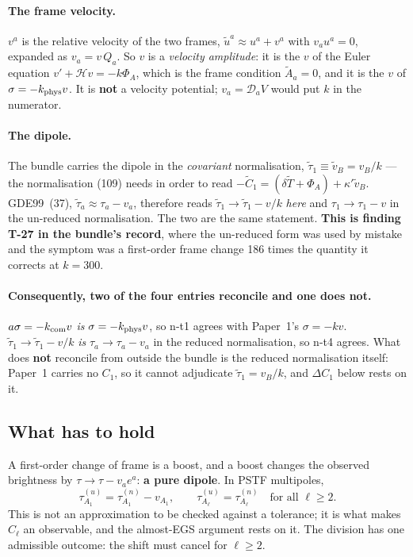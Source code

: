 \paragraph{The frame velocity.} $v^a$ is the relative velocity of the two
frames, $\tilde u^a\approx u^a+v^a$ with $v_au^a=0$, expanded as $v_a=v\,Q_a$.
So $v$ is a \emph{velocity amplitude}: it is the $v$ of the Euler equation
$v'+\mathcal Hv=-k\Phi_A$, which is the frame condition $\tilde A_a=0$, and it
is the $v$ of $\sigma=-k_{\rm phys}v$. It is \textbf{not} a velocity potential;
$v_a=\mathcal D_aV$ would put $k$ in the numerator.

\paragraph{The dipole.} The bundle carries the dipole in the \emph{covariant}
normalisation, $\tilde\tau_1\equiv\tilde v_B=v_B/k$ --- the normalisation (109)
needs in order to read $-\tilde C_1=(\delta\tilde T+\Phi_A)+\kappa'\tilde v_B$.
GDE99~(37), $\tilde\tau_a\approx\tau_a-v_a$, therefore reads
$\tilde\tau_1\to\tilde\tau_1-v/k$ \emph{here} and $\tau_1\to\tau_1-v$ in the
un-reduced normalisation. The two are the same statement. \textbf{This is finding
T-27 in the bundle's record}, where the un-reduced form was used by mistake
and the symptom was a first-order frame change 186 times the quantity it
corrects at $k=300$.

\paragraph{Consequently, two of the four entries reconcile and one does not.}
$a\sigma=-k_{\rm com}v$ \emph{is} $\sigma=-k_{\rm phys}v$, so n-t1 agrees with
Paper~1's $\sigma=-kv$. $\tilde\tau_1\to\tilde\tau_1-v/k$ \emph{is}
$\tau_a\to\tau_a-v_a$ in the reduced normalisation, so n-t4 agrees. What does
\textbf{not} reconcile from outside the bundle is the reduced normalisation
itself: Paper~1 carries no $C_1$, so it cannot adjudicate
$\tilde\tau_1=v_B/k$, and $\Delta C_1$ below rests on it.

\subsection{What has to hold}

A first-order change of frame is a boost, and a boost changes the observed
brightness by $\tau\to\tau-v_ae^a$: \textbf{a pure dipole}. In PSTF multipoles,
\begin{equation}
  \tau^{(u)}_{A_1}=\tau^{(n)}_{A_1}-v_{A_1},
  \qquad
  \tau^{(u)}_{A_\ell}=\tau^{(n)}_{A_\ell}\quad\text{for all }\ell\ge2 .
  \label{eq:boost-is-a-dipole}
\end{equation}
This is not an approximation to be checked against a tolerance; it is what
makes $C_\ell$ an observable, and the almost-EGS argument rests on it. The
division has one admissible outcome: the shift must cancel for $\ell\ge2$.

